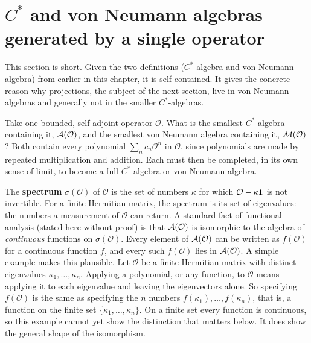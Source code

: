 \section{\texorpdfstring{$C^*$}{C*} and von Neumann algebras generated by a single operator}

This section is short. Given the two definitions ($C^*$-algebra and von Neumann algebra) from earlier in this
chapter, it is self-contained. It gives the concrete reason why projections, the subject of the next
section, live in von Neumann algebras and generally not in the smaller $C^*$-algebras.

Take one bounded, self-adjoint operator $\mathcal O$. What is the smallest $C^*$-algebra containing it,
$\mathcal{A}(\mathcal O)$, and the smallest von Neumann algebra containing it, $\mathcal{M}(\mathcal O)$? Both contain every
polynomial $\sum_n c_n\mathcal O^n$ in $\mathcal O$, since polynomials are made by repeated multiplication and
addition. Each must then be completed, in its own sense of limit, to become a full $C^*$-algebra or von
Neumann algebra.

The \textbf{spectrum} $\sigma(\mathcal O)$ of $\mathcal O$ is the set of numbers $\kappa$ for which
$\mathcal O-\kappa\mathbf{1}$ is not invertible. For a finite Hermitian matrix, the spectrum is its set of
eigenvalues: the numbers a measurement of $\mathcal O$ can return. A standard fact of functional analysis
(stated here without proof) is that $\mathcal{A}(\mathcal O)$ is isomorphic to the algebra of \emph{continuous}
functions on $\sigma(\mathcal O)$. Every element of $\mathcal{A}(\mathcal O)$ can be written as $f(\mathcal O)$ for a
continuous function $f$, and every such $f(\mathcal O)$ lies in $\mathcal{A}(\mathcal O)$. A simple example makes
this plausible. Let $\mathcal O$ be a finite Hermitian matrix with distinct eigenvalues
$\kappa_1,\dots,\kappa_n$. Applying a polynomial, or any function, to $\mathcal O$ means applying it to each
eigenvalue and leaving the eigenvectors alone. So specifying $f(\mathcal O)$ is the same as specifying the $n$
numbers $f(\kappa_1),\dots,f(\kappa_n)$, that is, a function on the finite set $\{\kappa_1,\dots,\kappa_n\}$.
On a finite set every function is continuous, so this example cannot yet show the distinction that matters
below. It does show the general shape of the isomorphism.

